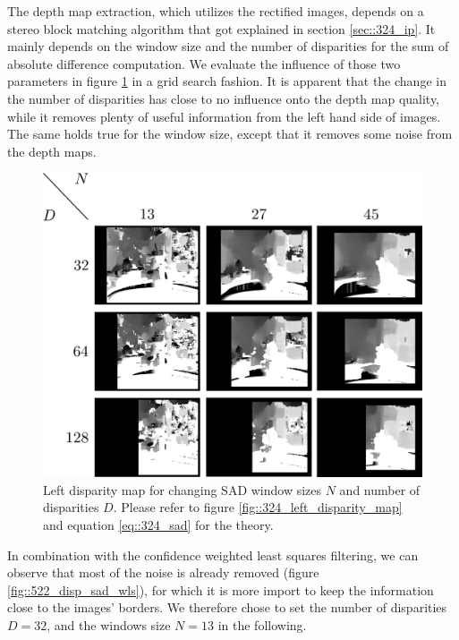 The depth map extraction, which utilizes the rectified images, depends on a stereo block matching algorithm that got explained in section \ref{sec::324_ip}. It mainly depends on the window size and the number of disparities for the sum of absolute difference computation. We evaluate the influence of those two parameters in figure \ref{fig::522_disp_sad} in a grid search fashion. It is apparent that the change in the number of disparities has close to no influence onto the depth map quality, while it removes plenty of useful information from the left hand side of images. The same holds true for the window size, except that it removes some noise from the depth maps.
\begin{figure}[h]
	\centering
	\includegraphics[scale=.25]{chapters/05_experiments/02_autonomous_walking/02_depth_map_parameter_tuning/disp_sad.png}
	\caption{Left disparity map for changing SAD window sizes $N$ and number of disparities $D$. Please refer to figure \ref{fig::324_left_disparity_map} and equation \ref{eq::324_sad} for the theory.}
	\label{fig::522_disp_sad}
\end{figure}
In combination with the confidence weighted least squares filtering, we can observe that most of the noise is already removed (figure \ref{fig::522_disp_sad_wls}), for which it is more import to keep the information close to the images' borders. We therefore chose to set the number of disparities $D=32$, and the windows size $N=13$ in the following.
